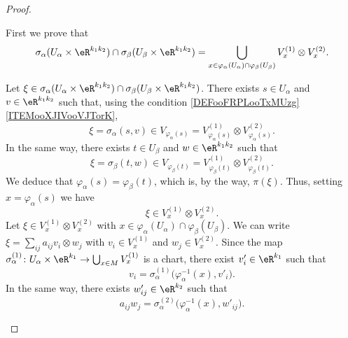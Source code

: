 \begin{proof}
\begin{subproof}
\begin{subproof}
			First we prove that
			\begin{equation}		\label{EQooNWFCooWcxQxa}
				\sigma_{\alpha}(U_{\alpha}\times \eR^{k_1k_2})\cap \sigma_{\beta}(U_{\beta}\times \eR^{k_1k_2})=\bigcup_{x\in \varphi_{\alpha}(U_{\alpha})\cap \varphi_{\beta}(U_{\beta})}V_x^{(1)}\otimes V_x^{(2)}.
			\end{equation}
			\begin{subproof}
				Let \( \xi\in \sigma_{\alpha}(U_{\alpha}\times \eR^{k_1k_2})\cap \sigma_{\beta}(U_{\beta}\times \eR^{k_1k_2})\). There exists \( s\in U_{\alpha}\) and \( v\in \eR^{k_1k_2}\) such that, using the condition \ref{DEFooFRPLooTxMUzg}\ref{ITEMooXJIVooVJTorK},
				\begin{equation}
					\xi=\sigma_{\alpha}(s,v)\in V_{\varphi_{\alpha}(s)}=V_{\varphi_{\alpha}(s)}^{(1)}\otimes V_{\varphi_{\alpha}(s)}^{(2)}.
				\end{equation}
				In the same way, there exists \( t\in U_{\beta}\) and \( w\in \eR^{k_1k_2}\) such that
				\begin{equation}
					\xi=\sigma_{\beta}(t,w)\in V_{\varphi_{\beta}(t)}=V_{\varphi_{\beta}(t)}^{(1)}\otimes V_{\varphi_{\beta}(t)}^{(2)}.
				\end{equation}
				We deduce that \( \varphi_{\alpha}(s)=\varphi_{\beta}(t)\), which is, by the way, \( \pi(\xi)\). Thus, setting \( x=\varphi_{\alpha}(s)\) we have
				\begin{equation}
					\xi\in V_x^{(1)}\otimes V_{x}^{(2)}.
				\end{equation}
				Let \( \xi\in V_x^{(1)}\otimes V_x^{(2)}\) with \( x\in \varphi_{\alpha}(U_{\alpha})\cap \varphi_{\beta}(U_{\beta})\). We can write \( \xi=\sum_{ij}a_{ij}v_i\otimes w_j\) with \( v_i\in V_x^{(1)}\) and \( w_j\in V_x^{(2)}\). Since the map \(\sigma_{\alpha}^{(1)} \colon U_{\alpha}\times \eR^{k_1}\to \bigcup_{x\in M}V_x^{(1)}  \) is a chart, there exist \( v'_i\in \eR^{k_1}\) such that
				\begin{equation}
					v_i=\sigma_{\alpha}^{(1)}\big( \varphi_{\alpha}^{-1}(x),v'_i \big).
				\end{equation}
				In the same way, there exists \( w'_{ij}\in \eR^{k_2}\) such that
				\begin{equation}
					a_{ij}w_j=\sigma_{\alpha}^{(2)}\big( \varphi_{\alpha}^{-1}(x),w'_{ij} \big).
				\end{equation}

\end{subproof}
\end{subproof}
\end{subproof}
\end{proof}
